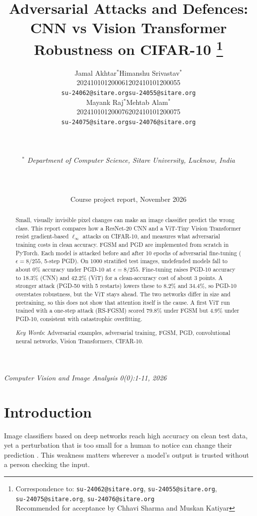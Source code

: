 \documentclass[twoside,a4paper,11pt]{article}
\title{Adversarial Attacks and Defences: CNN vs Vision Transformer
Robustness on CIFAR-10
\footnote[0]{\raggedright Correspondence to: \texttt{su-24062@sitare.org}, \texttt{su-24055@sitare.org},\\ \texttt{su-24075@sitare.org}, \texttt{su-24076@sitare.org}\\
Recommended for acceptance by Chhavi Sharma and Muskan Katiyar \vspace{0.2cm}}
}
\author{
\begin{tabular}{cc}
Jamal Akhtar$^*$                  & Himanshu Srivastav$^*$            \\
{\small 202410101200061}          & {\small 202410101200055}          \\
{\small \texttt{su-24062@sitare.org}} & {\small \texttt{su-24055@sitare.org}} \\[3mm]
Mayank Raj$^*$                    & Mehtab Alam$^*$                   \\
{\small 202410101200076}          & {\small 202410101200075}          \\
{\small \texttt{su-24075@sitare.org}} & {\small \texttt{su-24076@sitare.org}} \\
\end{tabular} \\ \\
\centerline{\small \em $^*$ Department of Computer Science, Sitare University, Lucknow, India} \\ \\
\centerline{\small Course project report, November 2026}
       }
\begin{document}
\maketitle

\pagestyle{myheadings}

         {\centerline{\small \it Computer Vision and Image Analysis 0(0):1-11, 2026}}
\hrulefill

\begin{abstract}

Small, visually invisible pixel changes can make an image classifier
predict the wrong class. This report compares how a ResNet-20 CNN and a
ViT-Tiny Vision Transformer resist gradient-based $\ell_\infty$ attacks
on CIFAR-10, and measures what adversarial training costs in clean
accuracy. FGSM and PGD are implemented from scratch in PyTorch. Each
model is attacked before and after 10 epochs of adversarial fine-tuning
($\epsilon = 8/255$, 5-step PGD). On 1000 stratified test images,
undefended models fall to about 0\% accuracy under PGD-10 at
$\epsilon = 8/255$. Fine-tuning raises PGD-10 accuracy to 18.3\% (CNN)
and 42.2\% (ViT) for a clean-accuracy cost of about 3 points. A stronger
attack (PGD-50 with 5 restarts) lowers these to 8.2\% and 34.4\%, so
PGD-10 overstates robustness, but the ViT stays ahead. The two networks
differ in size and pretraining, so this does not show that attention
itself is the cause. A first ViT run trained with a one-step attack
(RS-FGSM) scored 79.8\% under FGSM but 4.9\% under PGD-10, consistent
with catastrophic overfitting.

\vspace{0.5cm}
\noindent
{\em Key Words}: Adversarial examples, adversarial training, FGSM, PGD,
convolutional neural networks, Vision Transformers, CIFAR-10.

\end{abstract}
\hrulefill

\section{Introduction}

Image classifiers based on deep networks reach high accuracy on clean
test data, yet a perturbation that is too small for a human to notice can
change their prediction \cite{Szegedy:14,Goodfellow:15}. This weakness
matters wherever a model's output is trusted without a person checking
the input.
\end{document}
